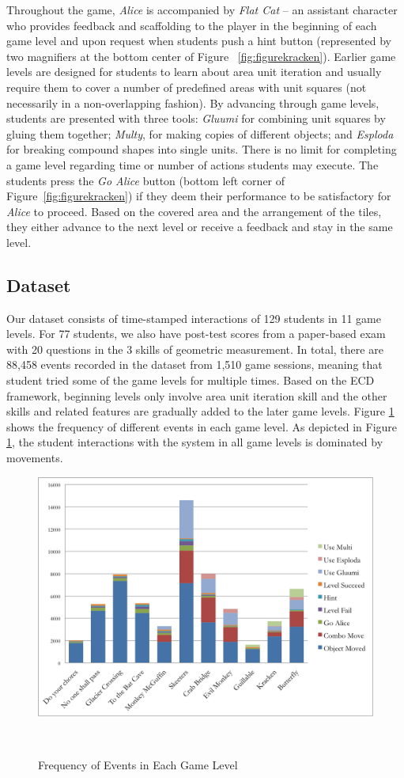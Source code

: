 \documentclass{sigchi}
\begin{document}
Throughout the game,  \textit {Alice} is accompanied by \textit {Flat Cat} -- an assistant character who provides feedback and scaffolding to the player in the beginning of each game level and upon request when students push a hint button (represented by two magnifiers at the bottom center of Figure ~\ref{fig:figurekracken}). Earlier game levels are designed for students to learn about area unit iteration and usually require them to cover a number of predefined areas with unit squares (not necessarily in a non-overlapping fashion). By advancing through game levels, students are presented with three tools: \textit {Gluumi} for combining unit squares by gluing them together; \textit {Multy}, for making copies of different objects; and \textit {Esploda} for breaking compound shapes into single units.  There is no limit for completing a game level regarding time or number of actions students may execute. The students press the \textit {Go Alice} button (bottom left corner of Figure~\ref{fig:figurekracken}) if they deem their performance to be satisfactory for \textit {Alice} to proceed. Based on the covered area and the arrangement of the tiles, they either advance to the next level or receive a feedback and stay in the same level.

\subsection{Dataset} 
Our dataset consists of time-stamped interactions of 129 students in 11 game levels. 
For 77 students, we also have post-test scores from a paper-based exam with 20 questions in the 3 skills of geometric measurement.
In total, there are 88,458 events recorded in the dataset from 1,510 game sessions, meaning that student tried some of the game levels for multiple times.
Based on the ECD framework, beginning levels only involve area unit iteration skill and the other skills and related features are gradually added to the later game levels.
Figure \ref{fig:frequency} shows the frequency of different events in each game level. As depicted in Figure \ref{fig:frequency}, the student interactions with the system in all game levels is dominated by movements.

\begin{figure}
	\centering
	\includegraphics[width=0.9\columnwidth]{figures/frequency.png}
	\caption{Frequency of Events in Each Game Level}~\label{fig:frequency}
\end{figure}
\end{document}
